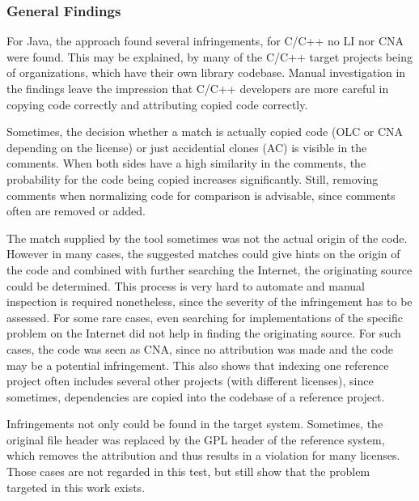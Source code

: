 \subsubsection*{General Findings}
For Java, the approach found several infringements, for C/C++ no LI nor CNA were found.
This may be explained, by many of the C/C++ target projects being of organizations, which have their own library codebase.
Manual investigation in the findings leave the impression that C/C++ developers are more careful in copying code correctly and attributing copied code correctly.

Sometimes, the decision whether a match is actually copied code (OLC or CNA depending on the license) or just accidential clones (AC) is visible in the comments.
When both sides have a high similarity in the comments, the probability for the code being copied increases significantly.
Still, removing comments when normalizing code for comparison is advisable, since comments often are removed or added.

The match supplied by the tool sometimes was not the actual origin of the code.
However in many cases, the suggested matches could give hints on the origin of the code and combined with further searching the Internet, the originating source could be determined.
This process is very hard to automate and manual inspection is required nonetheless, since the severity of the infringement has to be assessed.
For some rare cases, even searching for implementations of the specific problem on the Internet did not help in finding the originating source.
For such cases, the code was seen as CNA, since no attribution was made and the code may be a potential infringement.
This also shows that indexing one reference project often includes several other projects (with different licenses), since sometimes, dependencies are copied into the codebase of a reference project.

Infringements not only could be found in the target system.
Sometimes, the original file header was replaced by the GPL header of the reference system, which removes the attribution and thus results in a violation for many licenses.
Those cases are not regarded in this test, but still show that the problem targeted in this work exists.


